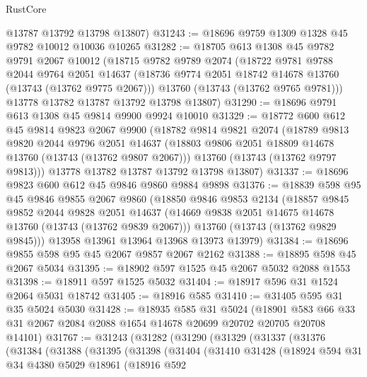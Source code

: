 \begin{lexlean}{RustCore}
\begin{coremodule}
      @13787
      @13792
      @13798
      @13807)
@31243 := @18696 @9759 @1309 @1328 @45 @9782 @10012 @10036 @10265
@31282 := @18705
    @613
    @1308
    @45
    @9782
    @9791
    @2067
    @10012
    (@18715
      @9782
      @9789
      @2074
      (@18722
        @9781
        @9788
        @2044
        @9764
        @2051
        @14637
        (@18736 @9774 @2051 @18742 @14678 @13760 (@13743 (@13762 @9775 @2067)))
        @13760
        (@13743 (@13762 @9765 @9781)))
      @13778
      @13782
      @13787
      @13792
      @13798
      @13807)
@31290 := @18696 @9791 @613 @1308 @45 @9814 @9900 @9924 @10010
@31329 := @18772
    @600
    @612
    @45
    @9814
    @9823
    @2067
    @9900
    (@18782
      @9814
      @9821
      @2074
      (@18789
        @9813
        @9820
        @2044
        @9796
        @2051
        @14637
        (@18803 @9806 @2051 @18809 @14678 @13760 (@13743 (@13762 @9807 @2067)))
        @13760
        (@13743 (@13762 @9797 @9813)))
      @13778
      @13782
      @13787
      @13792
      @13798
      @13807)
@31337 := @18696 @9823 @600 @612 @45 @9846 @9860 @9884 @9898
@31376 := @18839
    @598
    @95
    @45
    @9846
    @9855
    @2067
    @9860
    (@18850
      @9846
      @9853
      @2134
      (@18857
        @9845
        @9852
        @2044
        @9828
        @2051
        @14637
        (@14669 @9838 @2051 @14675 @14678 @13760 (@13743 (@13762 @9839 @2067)))
        @13760
        (@13743 (@13762 @9829 @9845)))
      @13958
      @13961
      @13964
      @13968
      @13973
      @13979)
@31384 := @18696 @9855 @598 @95 @45 @2067 @9857 @2067 @2162
@31388 := @18895 @598 @45 @2067 @5034
@31395 := @18902 @597 @1525 @45 @2067 @5032 @2088 @1553
@31398 := @18911 @597 @1525 @5032
@31404 := @18917 @596 @31 @1524 @2064 @5031 @18742
@31405 := @18916 @585
@31410 := @31405 @595 @31 @35 @5024 @5030
@31428 := @18935
    @585
    @31
    @5024
    (@18901 @583 @66 @33 @31 @2067 @2084 @2088 @1654 @14678 @20699 @20702 @20705 @20708 @14101)
@31767 := @31243
    (@31282
      (@31290
        (@31329
          (@31337
            (@31376
              (@31384
                (@31388
                  (@31395
                    (@31398
                      (@31404
                        (@31410
                          @31428
                          (@18924
                            @594
                            @31
                            @34
                            @4380
                            @5029
                            @18961
                            (@18916
                              @592

\end{coremodule}
\end{lexlean}
